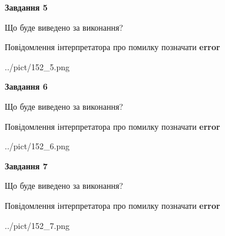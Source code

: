 \documentclass[10pt, ukrainian]{article}
\begin{document}
{\begin {large}
{\begin {center}\textbf{Завдання 5}\end {center}}\par
Що буде виведено за виконання? \par
Повідомлення інтерпретатора про помилку позначати \textbf{error}

\begin{center}
	{../pict/152_5.png}
\end{center}
\newpage

{\begin {center}\textbf{Завдання 6}\end {center}}\par
Що буде виведено за виконання? \par
Повідомлення інтерпретатора про помилку позначати \textbf{error}

\begin{center}
	{../pict/152_6.png}
\end{center}
\newpage

{\begin {center}\textbf{Завдання 7}\end {center}}\par
Що буде виведено за виконання? \par
Повідомлення інтерпретатора про помилку позначати \textbf{error}

\begin{center}
	{../pict/152_7.png}
\end{center}
\newpage

\end {large}}
\end{document}
